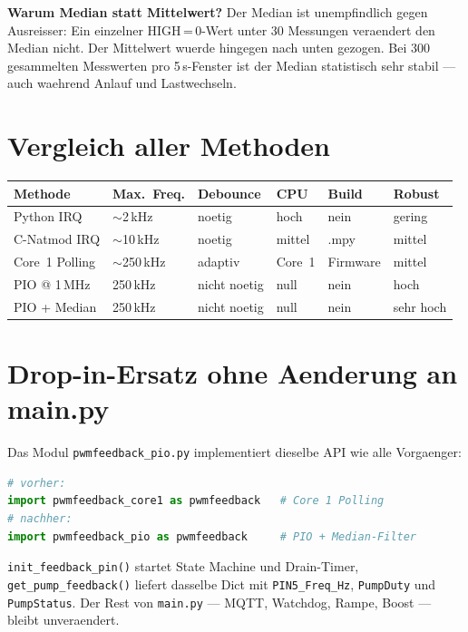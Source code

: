 \documentclass[11pt,a4paper]{article}
\begin{document}
\textbf{Warum Median statt Mittelwert?}
Der Median ist unempfindlich gegen Ausreisser:
Ein einzelner HIGH\,=\,0-Wert unter 30 Messungen veraendert den Median nicht.
Der Mittelwert wuerde hingegen nach unten gezogen.
Bei 300 gesammelten Messwerten pro 5\,s-Fenster ist der Median
statistisch sehr stabil --- auch waehrend Anlauf und Lastwechseln.

\section{Vergleich aller Methoden}

\begin{center}
\begin{tabular}{llllll}
\toprule
\textbf{Methode} & \textbf{Max.\ Freq.} & \textbf{Debounce} & \textbf{CPU} & \textbf{Build} & \textbf{Robust} \\
\midrule
Python IRQ        & $\sim$2\,kHz   & noetig    & hoch   & nein     & gering \\
C-Natmod IRQ      & $\sim$10\,kHz  & noetig    & mittel & .mpy     & mittel \\
Core~1 Polling    & $\sim$250\,kHz & adaptiv   & Core~1 & Firmware & mittel \\
PIO @ 1\,MHz      & 250\,kHz       & nicht noetig & null & nein   & hoch \\
PIO + Median      & 250\,kHz       & nicht noetig & null & nein   & sehr hoch \\
\bottomrule
\end{tabular}
\end{center}

\section{Drop-in-Ersatz ohne Aenderung an main.py}

Das Modul \texttt{pwmfeedback\_pio.py} implementiert dieselbe API
wie alle Vorgaenger:

\begin{lstlisting}[language=Python, caption={Umschalten in main.py: eine Zeile}]
# vorher:
import pwmfeedback_core1 as pwmfeedback   # Core 1 Polling
# nachher:
import pwmfeedback_pio as pwmfeedback     # PIO + Median-Filter
\end{lstlisting}

\texttt{init\_feedback\_pin()} startet State Machine und Drain-Timer,
\texttt{get\_pump\_feedback()} liefert dasselbe Dict mit
\texttt{PIN5\_Freq\_Hz}, \texttt{PumpDuty} und \texttt{PumpStatus}.
Der Rest von \texttt{main.py} --- MQTT, Watchdog, Rampe, Boost ---
bleibt unveraendert.
\end{document}
